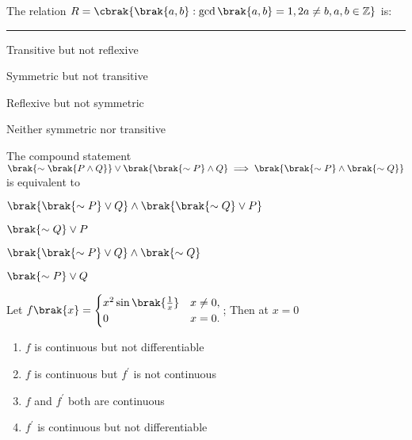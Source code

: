 \iffalse
\title{2023}
\author{EE24Btech11024}
\section{mcq-single}
\fi

\item The relation $R=\cbrak{\brak{a,b}:\gcd\brak{a,b}=1,2a\neq b,a,b\in \mathbb{Z}}$ is:\rule{1cm}{0.15mm} 

\hfill{}
\begin{enumerate}
\begin{multicols}{2}
\item Transitive but not reflexive
\item Symmetric but not transitive
\item Reflexive but not symmetric
\item Neither symmetric nor transitive
\end{multicols}
\end{enumerate}

\item The compound statement $\brak{\sim\brak{P\wedge Q}}\vee\brak{\brak{\sim P}\wedge Q}\implies\brak{\brak{\sim P}\wedge\brak{\sim Q}}$ is equivalent to

\hfill{}
\begin{enumerate}
\begin{multicols}{2}
\item $\brak{\brak{\sim P}\vee Q}\wedge\brak{\brak{\sim Q}\vee P}$
\item $\brak{\sim Q}\vee P$
\item $\brak{\brak{\sim P}\vee Q}\wedge\brak{\sim Q}$
\item $\brak{\sim P}\vee Q$
\end{multicols}
\end{enumerate}

\item Let $f\brak{x} = \begin{cases} x^2\sin\brak{\frac{1}{x}} & x\neq 0, \\0 & x=0 .\end{cases}$; Then at $x=0$

\hfill{}
\begin{enumerate}
\item $f$ is continuous but not differentiable
\item $f$ is continuous but $f^\prime$ is not continuous
\item $f$ and $f^\prime$ both are continuous 
\item $f^\prime$ is continuous but not differentiable
\end{enumerate}

